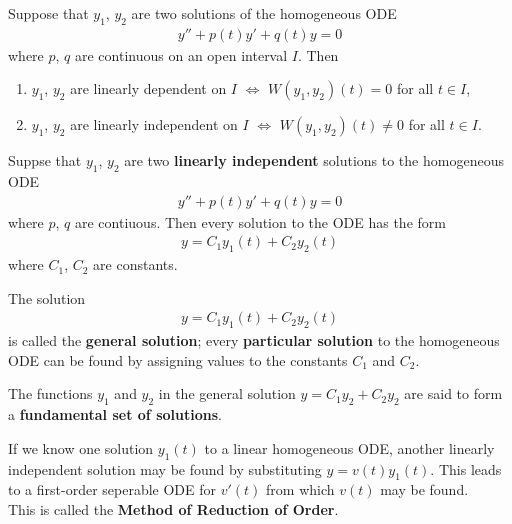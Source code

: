\documentclass{article}
\begin{document}
\begin{theorem}
    Suppose that $y_1$, $y_2$ are two solutions of the homogeneous ODE
    \begin{align*}
        y''+p(t)y'+q(t)y =0
    \end{align*}
    where $p$, $q$ are continuous on an open interval $I$. Then
    \begin{enumerate}
        \item $y_1$, $y_2$ are linearly dependent on $I$ $\Leftrightarrow$ $W(y_1,y_2)(t)=0$ for all $t\in I$,
        \item $y_1$, $y_2$ are linearly independent on $I$ $\Leftrightarrow$ $W(y_1,y_2)(t)\not=0$ for all $t\in I$.
    \end{enumerate}
\end{theorem}
\begin{theorem}
    Suppse that $y_1$, $y_2$ are two \textbf{linearly independent} solutions to the
    homogeneous ODE
    \begin{align*}
        y''+p(t)y'+q(t)y =0
    \end{align*}
    where $p$, $q$ are contiuous. Then every solution to the ODE has the
    form
    \begin{align*}
        y = C_1y_1(t)+C_2y_2(t)
    \end{align*}
    where $C_1$, $C_2$ are constants.
\end{theorem}
\begin{definition}
    The solution
    \begin{align*}
        y=C_1y_1(t)+C_2y_2(t)
    \end{align*}
    is called the \textbf{general solution}; every \textbf{particular solution}
    to the homogeneous ODE can be found by assigning values to the
    constants $C_1$ and $C_2$.
\end{definition}
\begin{definition}
    The functions $y_1$ and $y_2$ in the general solution $y=C_1y_2+C_2y_2$
    are said to form a \textbf{fundamental set of solutions}.
\end{definition}
\begin{lemma}
    If we know one solution $y_1(t)$ to a linear homogeneous ODE, another
    linearly independent solution may be found by substituting $y=v(t)y_1(t)$.
    This leads to a first-order seperable ODE for $v'(t)$ from which
    $v(t)$ may be found.\\
    This is called the \textbf{Method of Reduction of Order}.
\end{lemma}
\end{document}
